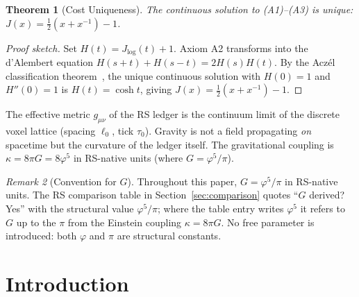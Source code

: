 \documentclass[12pt,a4paper]{article}
\newtheorem{theorem}{Theorem}[section]
\theoremstyle{definition}
\theoremstyle{remark}
\newtheorem{remark}[theorem]{Remark}
\begin{document}
\begin{theorem}[Cost Uniqueness]
\label{thm:unique}
The continuous solution to \textup{(A1)--(A3)} is unique:
$J(x) = \tfrac{1}{2}(x + x^{-1}) - 1$.
\end{theorem}

\begin{proof}[Proof sketch]
Set $H(t) = J_{\log}(t)+1$.  Axiom A2 transforms into the d'Alembert
equation $H(s+t)+H(s-t)=2H(s)H(t)$.  By the Acz\'el classification
theorem~\cite{Aczel1966}, the unique continuous solution with $H(0)=1$
and $H''(0)=1$ is $H(t)=\cosh t$, giving
$J(x)=\tfrac{1}{2}(x+x^{-1})-1$.
\end{proof}

\noindent The effective metric $g_{\mu\nu}$ of the RS ledger is the
continuum limit of the discrete voxel lattice (spacing $\ell_0$, tick
$\tau_0$).  Gravity is not a field propagating \emph{on} spacetime but
the curvature of the ledger itself.  The gravitational coupling is
$\kappa = 8\pi G = 8\varphi^5$ in RS-native units
(where $G = \varphi^5/\pi$).

\begin{remark}[Convention for $G$]
\label{rem:G-convention}
Throughout this paper, $G = \varphi^5/\pi$ in RS-native units.
The RS comparison table in Section~\ref{sec:comparison} quotes
``$G$ derived? Yes'' with the structural value $\varphi^5/\pi$;
where the table entry writes $\varphi^5$ it refers to $G$ up to the
$\pi$ from the Einstein coupling $\kappa = 8\pi G$.  No free parameter
is introduced: both $\varphi$ and $\pi$ are structural constants.
\end{remark}

\section{Introduction}
\label{sec:intro}
\end{document}
